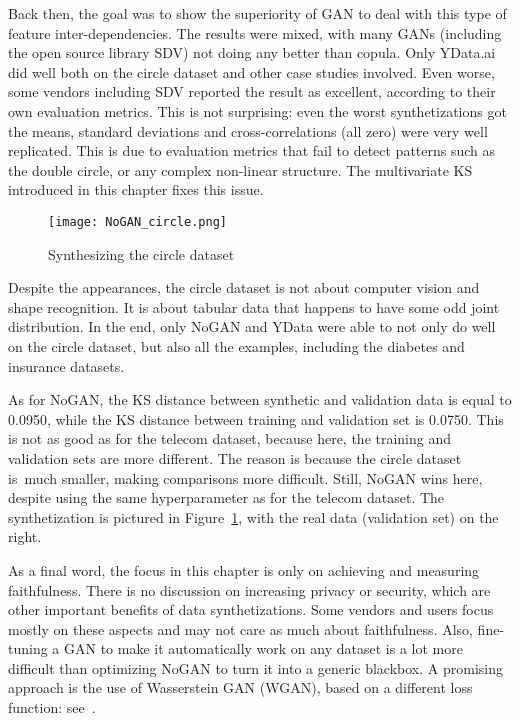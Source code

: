 \documentclass[oneside,10pt]{book}
\begin{document}
Back then, the goal was to show the superiority of GAN to deal with this type of feature inter-dependencies. The results were mixed, with many GANs (including the open source library SDV) not doing any better than copula. Only YData.ai did well both on the circle dataset and other case studies involved.
Even worse, some vendors including SDV reported the result as excellent, according to their  own evaluation metrics. This is not surprising: even the worst synthetizations got the means, standard deviations and cross-correlations (all zero) were very well replicated. This is due to evaluation
 metrics that fail to detect patterns such as the double circle, or any complex non-linear structure. The multivariate KS introduced in this chapter fixes this issue.

\begin{figure}[H]
\centering
\texttt{[image: NoGAN\_circle.png]} %
\caption{Synthesizing the circle dataset}
\label{fig:nogancc}
\end{figure}



Despite the appearances, the circle dataset is not about computer vision and shape recognition. It is about tabular data 
 that happens to have some odd joint distribution. In the end, only NoGAN and YData were able to not only do well  on  the circle dataset,
 but also all the  examples, including the diabetes and insurance datasets.

As for NoGAN, the KS distance between synthetic and validation data is equal to 0.0950, while the KS distance between training and validation set is 0.0750. This is not as good as for the telecom dataset, because here, the training and validation sets are more different. The reason is because the circle dataset is~much smaller, making comparisons more difficult. Still, NoGAN wins here, despite using the same hyperparameter as for the telecom dataset. The synthetization is pictured in Figure~\ref{fig:nogancc}, with the real data (validation set) on the right.

As a final word, the focus in this chapter is only on achieving and measuring faithfulness. There is no discussion on increasing privacy or security, which are other important benefits   of data synthetizations. Some vendors and users focus mostly on these aspects and may not care as much about faithfulness. Also, fine-tuning a GAN to make it automatically work on any dataset is a lot more difficult than optimizing NoGAN to turn it into 
 a generic blackbox. A promising approach is the use of 
\textcolor{index}{Wasserstein GAN} (WGAN), based on a different \textcolor{index}{loss function}: see~\cite{ieeewgan}.
\end{document}

